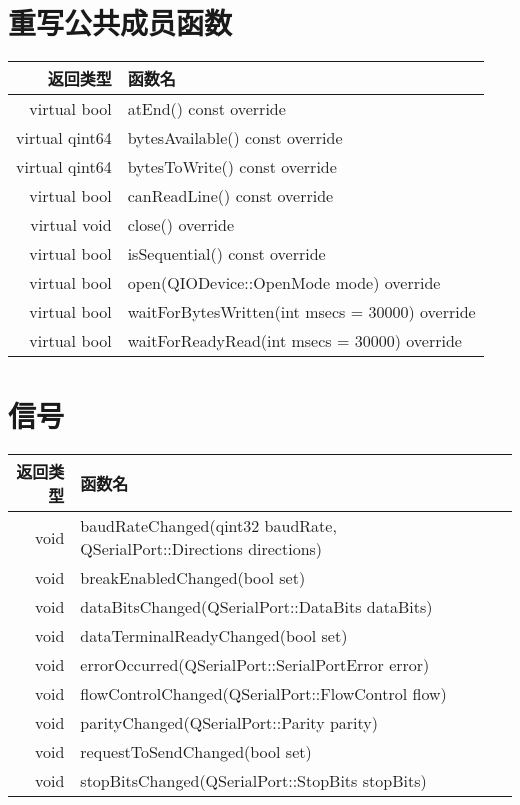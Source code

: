 \section{重写公共成员函数}

\begin{longtable}{|r|m{25em}|}
	\hline
	返回类型&	函数名 \\ 
	\hline
	virtual bool 	&atEnd() const override \\ 
	\hline
virtual qint64&	bytesAvailable() const override \\ 
\hline
virtual qint64&	bytesToWrite() const override \\ 
\hline
virtual bool&	canReadLine() const override \\ 
\hline
virtual void&	close() override \\ 
\hline
virtual bool	&isSequential() const override \\ 
\hline
virtual bool&	open(QIODevice::OpenMode mode) override \\ 
\hline
virtual bool&	waitForBytesWritten(int msecs = 30000) override \\ 
\hline
virtual bool&	waitForReadyRead(int msecs = 30000) override \\
	\hline
\end{longtable}


\section{信号}

\begin{longtable}{|r|l|}
\hline
返回类型&	函数名 \\ 
\hline
void	&baudRateChanged(qint32 baudRate, QSerialPort::Directions directions) \\ 
\hline
void	&breakEnabledChanged(bool set) \\ 
\hline
void	&dataBitsChanged(QSerialPort::DataBits dataBits) \\ 
\hline
void	&dataTerminalReadyChanged(bool set) \\ 
\hline
void	&errorOccurred(QSerialPort::SerialPortError error) \\  
\hline
void&	flowControlChanged(QSerialPort::FlowControl flow) \\ 
\hline
void&	parityChanged(QSerialPort::Parity parity) \\ 
\hline
void&	requestToSendChanged(bool set) \\ 
\hline
void&	stopBitsChanged(QSerialPort::StopBits stopBits) \\ 
\hline
\end{longtable}

